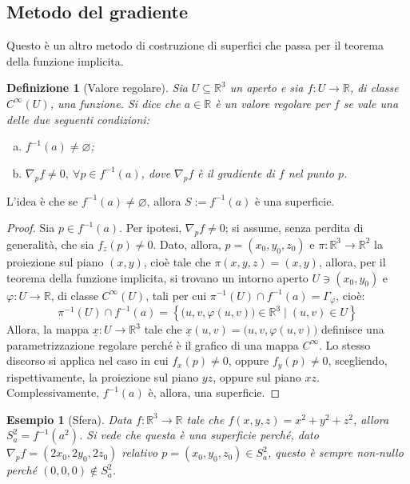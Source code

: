 \documentclass[12pt]{scrartcl}
\theoremstyle{style}
\newtheorem{esempio}{Esempio}[section]
\newtheorem{definizione}{Definizione}[section]
\numberwithin{equation}{subsection}
\begin{document}
\subsection{Metodo del gradiente}
Questo \`e un altro metodo di costruzione di superfici che passa per il teorema della funzione implicita.
\begin{definizione}
	[Valore regolare]
Sia $U \subseteq \mathbb{R}^3$ un aperto e sia $f : U \to \mathbb{R}$, di classe $C^\infty(U)$, una funzione. Si dice che $a \in \mathbb{R}$ \`e un \textit{valore regolare} per $f$ se vale una delle due seguenti condizioni:
\begin{enumerate}[(a).]
	\item $f^{-1}(a) \neq \varnothing$;
	\item $\nabla _p f \neq 0, \ \forall  p\in f^{-1}(a)$, dove $\nabla _p f$ \`e il gradiente di $f$ nel punto $p$.
\end{enumerate}
\end{definizione}
\noindent L'idea \`e che se $f^{-1}(a) \neq \varnothing$, allora $S := f^{-1}(a)$ \`e una superficie.
\begin{proof}
	Sia $p \in f^{-1}(a)$. 
	Per ipotesi, $\nabla _p f \neq 0$; si assume, senza perdita di generalit\`a, che sia $f_z (p) \neq 0$.
	Dato, allora, $p = (x_0,y_0,z_0)$ e $\pi: \mathbb{R}^3 \to \mathbb{R}^2$ la proiezione sul piano $(x,y)$, cio\`e tale che $\pi(x,y,z) = (x,y)$, allora, per il teorema della funzione implicita, si trovano un intorno aperto $U\ni (x_0,y_0)$ e $\varphi :U\to \mathbb{R}$, di classe $C^\infty(U)$, tali per cui $\pi^{-1}(U)\cap f^{-1}(a) = \Gamma_\varphi $, cio\`e:
	\[
	\pi^{-1}(U) \cap f^{-1}(a) = \left\{ \big(u,v,\varphi (u,v)\big) \in \mathbb{R}^3\mid (u,v) \in U \right\} 
	\] 
	Allora, la mappa $\underline{x}: U \to \mathbb{R}^3$ tale che $\underline{x}(u,v) = \big(u,v,\varphi (u,v)\big)$ definisce una parametrizzazione regolare perch\'e \`e il grafico di una mappa $C^\infty$.
	Lo stesso discorso si applica nel caso in cui $f_x(p) \neq 0$, oppure $f_y(p) \neq 0$, scegliendo, rispettivamente, la proiezione sul piano $yz$, oppure sul piano $xz$.
	Complessivamente, $f^{-1}(a)$ \`e, allora, una superficie.
\end{proof}
\begin{esempio}
	[Sfera]
	Data $f : \mathbb{R}^3 \to \mathbb{R}$ tale che $f(x,y,z) = x^2 + y^2 + z^2$, allora $S^2_a = f^{-1}(a^2)$.
	Si vede che questa \`e una superficie perch\'e, dato $\nabla_p f = (2x_0,2y_0,2z_0)$ relativo $p = (x_0,y_0,z_0) \in S^2_a$, questo \`e sempre non-nullo perch\'e $(0,0,0) \not \in S_a^2$.
\end{esempio}
\end{document}
